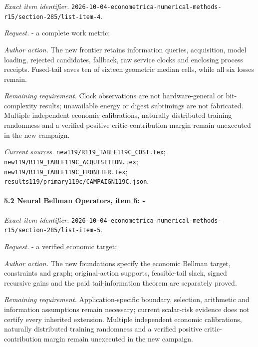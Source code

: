 \emph{Exact item identifier.} \nolinkurl{2026-10-04-econometrica-numerical-methods-r15/section-285/list-item-4}.

\par\emph{Request.} - a complete work metric;

\par\emph{Author action.} The new frontier retains information queries, acquisition, model loading, rejected candidates, fallback, raw service clocks and enclosing process receipts. Fused-tail saves ten of sixteen geometric median cells, while all six losses remain.

\par\emph{Remaining requirement.} Clock observations are not hardware-general or bit-complexity results; unavailable energy or digest subtimings are not fabricated. Multiple independent economic calibrations, naturally distributed training randomness and a verified positive critic-contribution margin remain unexecuted in the new campaign.

\par\emph{Current sources.} \nolinkurl{new119/R119_TABLE119C_COST.tex}; \nolinkurl{new119/R119_TABLE119C_ACQUISITION.tex}; \nolinkurl{new119/R119_TABLE119C_FRONTIER.tex}; \nolinkurl{results119/primary119c/CAMPAIGN119C.json}.

\paragraph{5.2 Neural Bellman Operators, item 5: -}

\emph{Exact item identifier.} \nolinkurl{2026-10-04-econometrica-numerical-methods-r15/section-285/list-item-5}.

\par\emph{Request.} - a verified economic target;

\par\emph{Author action.} The new foundations specify the economic Bellman target, constraints and graph; original-action supports, feasible-tail slack, signed recursive gains and the paid tail-information theorem are separately proved.

\par\emph{Remaining requirement.} Application-specific boundary, selection, arithmetic and information assumptions remain necessary; current scalar-risk evidence does not certify every inherited extension. Multiple independent economic calibrations, naturally distributed training randomness and a verified positive critic-contribution margin remain unexecuted in the new campaign.

